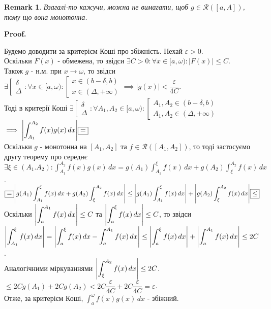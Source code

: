 \documentclass[a4paper, 10pt]{article}
\makeatletter
\def\huge{\displaystyle}
\def\qed{$\blacksquare$}
\theoremstyle{theoremdd}
\theoremstyle{theoremdd}
\theoremstyle{theoremdd}
\theoremstyle{theoremdd}
\theoremstyle{theoremdd}
\theoremstyle{theoremdd}
\newtheorem{remark}[theorem]{Remark}
\theoremstyle{theoremdd}
\theoremstyle{theoremdd}
\renewenvironment{proof}[1][Proof.\\]{\par
\pushQED{\hfill \qed}%
\normalfont \topsep6\p@\@plus6\p@\relax
\trivlist
\item\relax
{\bfseries
#1\@addpunct{.}}\hspace\labelsep\ignorespaces
}{%
\popQED\endtrivlist\@endpefalse
}
\makeatother
\begin{document}
\begin{remark}
Взагалі-то кажучи, можна не вимагати, щоб $g \in \mathcal{R}([a,A])$, тому що вона монотонна.
\end{remark}

\begin{proof}
Будемо доводити за критерієм Коші про збіжність. Нехай $\varepsilon > 0$.\\
Оскільки $F(x)$ - обмежена, то звідси $\exists C > 0: \forall x \in [a,\omega): |F(x)| \leq C$.\\
Також $g$ - н.м. при $x \to \omega$, то звідси $\exists \left[ \begin{gathered} \delta \\ \Delta \end{gathered} \right.: \forall x \in [a,\omega): \left[ \begin{gathered} x \in (b-\delta,b) \\ x \in (\Delta,+\infty) \end{gathered} \right. \implies |g(x)| < \dfrac{\varepsilon}{4C}$.\\
Тоді в критерії Коші $\exists \left[ \begin{gathered} \delta \\ \Delta \end{gathered} \right.: \forall A_1,A_2 \in [a,\omega): \left[ \begin{gathered} A_1,A_2 \in (b-\delta,b) \\ A_1,A_2 \in (\Delta,+\infty) \end{gathered} \right.$\\
$\huge\implies \abs{\int_{A_1}^{A_2} f(x)g(x)\,dx} \boxed{=}$\\
Оскільки $g$ - монотонна на $[A_1,A_2]$ та $f \in \mathcal{R}([A_1,A_2])$, то тоді застосуємо другу теорему про середнє\\
$\exists \xi \in (A_1.A_2): \huge\int_{A_1}^{A_2} f(x)g(x)\,dx = g(A_1) \int_{A_1}^{\xi} f(x)\,dx + g(A_2) \int_{\xi}^{A_2} f(x)\,dx$.\\
$\huge\boxed{=} \abs{g(A_1) \int_{A_1}^{\xi} f(x)\,dx + g(A_2) \int_{\xi}^{A_2} f(x)\,dx} \leq \abs{g(A_1) \int_{A_1}^{\xi} f(x)\,dx} + \abs{g(A_2) \int_{\xi}^{A_2} f(x)\,dx} \boxed{\leq}$\\
Оскільки $\abs{\huge\int_a^{A_1} f(x)\,dx} \leq C$ та $\abs{\huge\int_a^{\xi} f(x)\,dx} \leq C$, то звідси \\ $\huge\abs{\int_{A_1}^{\xi} f(x)\,dx} = \abs{\int_{a}^{\xi} f(x)\,dx - \int_{a}^{A_1}f(x)\,dx} \leq \abs{\int_a^\xi f(x)\,dx} + \abs{\int_a^{A_1} f(x)\,dx} \leq 2C$.\\
Аналогічними міркуваннями $\huge\abs{\int_{\xi}^{A_2} f(x)\,dx} \leq 2C$.\\
$\boxed{\leq} 2C g(A_1) + 2C g(A_2) < 2C \dfrac{\varepsilon}{4C} + 2C \dfrac{\varepsilon}{4C} = \varepsilon$.\\
Отже, за критерієм Коші, $\huge\int_a^\omega f(x)g(x)\,dx$ - збіжний.
\end{proof}
\end{document}
